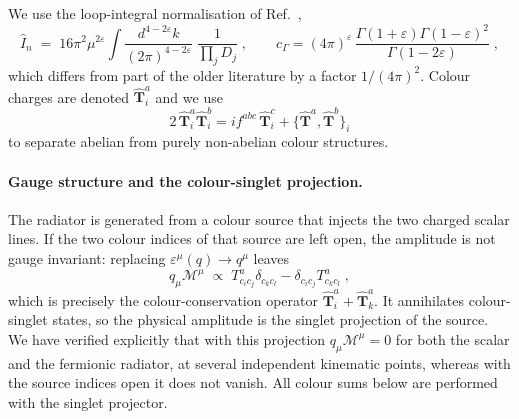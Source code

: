 \documentclass[11pt,a4paper]{article}
\newcommand{\eps}{\varepsilon}
\newcommand{\Top}[1]{\hat{\mathbf{T}}_{#1}}
\newcommand{\Ihat}{\hat{I}}
\newcommand{\cG}{c_\Gamma}
\begin{document}
We use the loop-integral normalisation of Ref.~\cite{Campbell:2025},
\begin{equation}
  \Ihat_n \;=\; 16\pi^2\mu^{2\eps}\!\int\!\frac{d^{4-2\eps}k}{(2\pi)^{4-2\eps}}\;
  \frac{1}{\prod_{j}D_j}\;,
  \qquad
  \cG=(4\pi)^{\eps}\,\frac{\Gamma(1+\eps)\Gamma(1-\eps)^2}{\Gamma(1-2\eps)}\;,
  \label{eq:normalisation}
\end{equation}
which differs from part of the older literature by a factor $1/(4\pi)^2$. Colour
charges are denoted $\Top{i}^a$ and we use
\begin{equation}
  2\,\Top{i}^a\Top{i}^b=i f^{abc}\,\Top{i}^c+\big\{\Top{}^a,\Top{}^b\big\}_i
  \label{eq:colour-identity}
\end{equation}
to separate abelian from purely non-abelian colour structures.

\paragraph{Gauge structure and the colour-singlet projection.}
The radiator is generated from a colour source that injects the two charged
scalar lines. If the two colour indices of that source are left open, the
amplitude is  {not} gauge invariant: replacing $\eps^\mu(q)\to q^\mu$ leaves
\begin{equation}
  q_\mu\mathcal{M}^{\mu}\;\propto\;
  T^a_{c_ic_j}\delta_{c_kc_l}-\delta_{c_ic_j}T^a_{c_kc_l}\;,
  \label{eq:ward-residual}
\end{equation}
which is precisely the colour-conservation operator $\Top{i}^a+\Top{k}^a$. It
annihilates colour-singlet states, so the physical amplitude is the singlet
projection of the source. We have verified explicitly that with this projection
$q_\mu\mathcal{M}^\mu=0$ for both the scalar and the fermionic radiator, at
several independent kinematic points, whereas with the source indices open it
does not vanish. All colour sums below are performed with the singlet projector.
\end{document}
